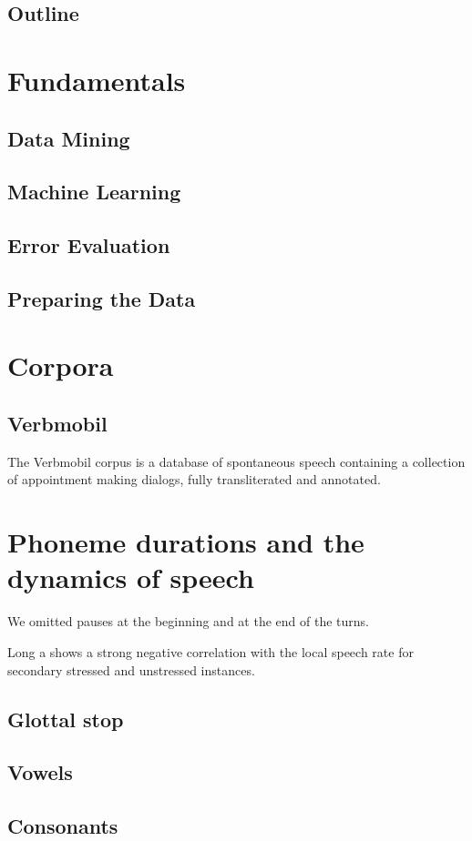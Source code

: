 \documentclass[a4paper]{scrreprt}
\begin{document}
\section{Outline}

\chapter{Fundamentals}
\section{Data Mining}
\section{Machine Learning}
\section{Error Evaluation}
\section{Preparing the Data}

\chapter{Corpora}
\section{Verbmobil}
The Verbmobil corpus is a database of spontaneous speech containing a collection of appointment making dialogs, fully transliterated and annotated.

\chapter{Phoneme durations and the dynamics of speech}
We omitted pauses at the beginning and at the end of the turns.

Long a shows a strong negative correlation with the local speech rate for secondary stressed and unstressed instances.

\section{Glottal stop}
\section{Vowels}
\section{Consonants}
\end{document}
